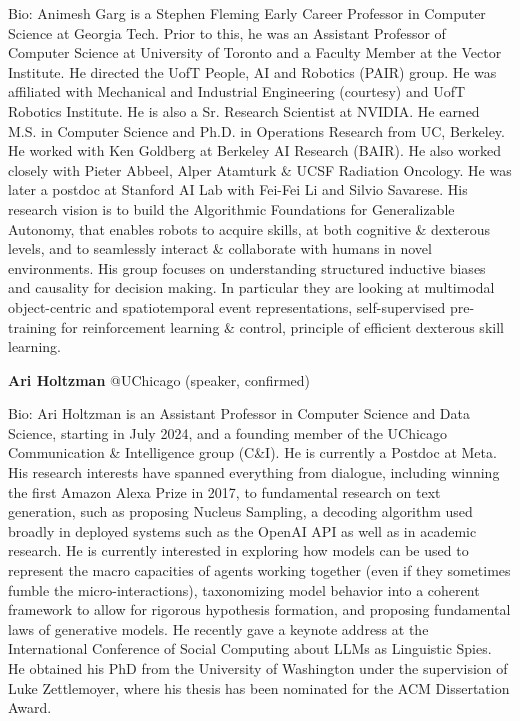 \documentclass[10pt]{article} %
\newcounter{exa}
\begin{document}
Bio: Animesh Garg is a Stephen Fleming Early Career Professor in Computer Science at Georgia Tech. Prior to this, he was an Assistant Professor of Computer Science at University of Toronto and a Faculty Member at the Vector Institute. He directed the UofT People, AI and Robotics (PAIR) group. He was affiliated with Mechanical and Industrial Engineering (courtesy) and UofT Robotics Institute. He is also a Sr. Research Scientist at NVIDIA. He earned M.S. in Computer Science and Ph.D. in Operations Research from UC, Berkeley. He worked with Ken Goldberg at Berkeley AI Research (BAIR). He also worked closely with Pieter Abbeel, Alper Atamturk \& UCSF Radiation Oncology. He was later a postdoc at Stanford AI Lab with Fei-Fei Li and Silvio Savarese. His research vision is to build the Algorithmic Foundations for Generalizable Autonomy, that enables robots to acquire skills, at both cognitive \& dexterous levels, and to seamlessly interact \& collaborate with humans in novel environments. His group focuses on understanding structured inductive biases and causality for decision making. In particular they are looking at multimodal object-centric and spatiotemporal event representations, self-supervised pre-training for reinforcement learning \& control, principle of efficient dexterous skill learning.


\textbf{Ari Holtzman} @UChicago (speaker, confirmed)  

Bio: Ari Holtzman is an Assistant Professor in Computer Science and Data Science, starting in July 2024, and a founding member of the UChicago Communication \& Intelligence group (C\&I). He is currently a Postdoc at Meta. His research interests have spanned everything from dialogue, including winning the first Amazon Alexa Prize in 2017, to fundamental research on text generation, such as proposing Nucleus Sampling, a decoding algorithm used broadly in deployed systems such as the OpenAI API as well as in academic research.  He is currently interested in exploring how models can be used to represent the macro capacities of agents working together (even if they sometimes fumble the micro-interactions), taxonomizing model behavior into a coherent framework to allow for rigorous hypothesis formation, and proposing fundamental laws of generative models. He recently gave a keynote address at the International Conference of Social Computing about LLMs as Linguistic Spies. He obtained his PhD from the University of Washington under the supervision of Luke Zettlemoyer, where his thesis has been nominated for the ACM Dissertation Award.  
\end{document}
